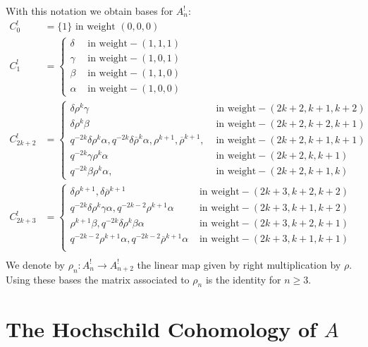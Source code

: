 \documentclass[11pt,fleqn]{article}
\renewcommand\to{\longrightarrow}
\newcommand\orho{\overline\rho}
\begin{document}
With this notation we obtain bases for $A^!_n$:
\begin{align*}
C^!_0 
  &= \{1\} \mbox{ in weight } (0,0,0) \\
C^!_1 
  &= \begin{cases} 
    \delta  & \mbox{ in weight} -(1,1,1) \\
    \gamma  & \mbox{ in weight} -(1,0,1) \\
    \beta  & \mbox{ in weight} -(1,1,0) \\
    \alpha  & \mbox{ in weight} -(1,0,0)
    \end{cases}  \\
C^!_{2k+2}  
  &= \begin{cases}
  \delta \rho^k \gamma & \mbox{ in weight} -(2k+2,k+1,k+2) \\
  \delta \rho^k\beta & \mbox{ in weight} -(2k+2,k+2,k+1) \\
	q^{-2k}\delta\rho^k\alpha, q^{-2k}\delta\orho^k\alpha, 
	\rho^{k+1}, \orho^{k+1},
    & \mbox{ in weight} -(2k+2,k+1,k+1) \\
	q^{-2k}\gamma\rho^k \alpha & \mbox{ in weight} -(2k+2,k,k+1) \\
	q^{-2k}\beta\rho^k\alpha, & \mbox{ in weight} -(2k+2,k+1,k)     
    \end{cases}\\
C^!_{2k+3} 
  &= \begin{cases} 
	\delta\rho^{k+1}, \delta\orho^{k+1}
    & \mbox{ in weight} -(2k+3,k+2,k+2) \\
	q^{-2k}\delta\rho^k\gamma\alpha, q^{-2k-2}\rho^{k+1}\alpha
    & \mbox{ in weight} -(2k+3,k+1,k+2) \\
	\rho^{k+1}\beta, q^{-2k}\delta\rho^k\beta\alpha
    & \mbox{ in weight} -(2k+3,k+2,k+1) \\
  q^{-2k-2}\rho^{k+1}\alpha, q^{-2k-2}\orho^{k+1}\alpha
    & \mbox{ in weight} -(2k+3,k+1,k+1) \\
  \end{cases}\\
\end{align*}
We denote by $\rho_n: A_n^! \to A^!_{n+2}$ the linear map given by right multiplication 
by $\rho$. Using these bases the matrix associated to $\rho_n$ is the identity for $n 
\geq 3$.



\section{The Hochschild Cohomology of $A$}
\end{document}
